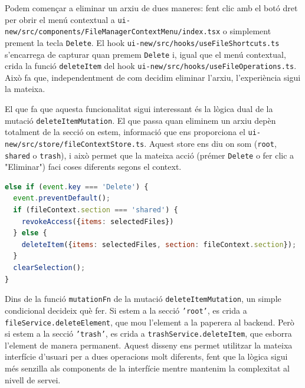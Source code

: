 Podem començar a eliminar un arxiu de dues maneres: fent clic amb el botó dret per obrir el menú contextual a \texttt{ui-new/src/components/FileManagerContextMenu/index.tsx} o simplement prement la tecla \texttt{Delete}. El hook \texttt{ui-new/src/hooks/useFileShortcuts.ts} s'encarrega de capturar quan premem \texttt{Delete} i, igual que el menú contextual, crida la funció \texttt{deleteItem} del hook \texttt{ui-new/src/hooks/useFileOperations.ts}. Això fa que, independentment de com decidim eliminar l'arxiu, l'experiència sigui la mateixa.

El que fa que aquesta funcionalitat sigui interessant és la lògica dual de la mutació \texttt{deleteItemMutation}. El que passa quan eliminem un arxiu depèn totalment de la secció on estem, informació que ens proporciona el \texttt{ui-new/src/store/fileContextStore.ts}. Aquest store ens diu on som (\texttt{root}, \texttt{shared} o \texttt{trash}), i això permet que la mateixa acció (prémer \texttt{Delete} o fer clic a "Eliminar") faci coses diferents segons el context.

\begin{lstlisting}[language=javascript, caption={Gestió de la tecla Delete a `useFileShortcuts.ts`}]
else if (event.key === 'Delete') {
  event.preventDefault();
  if (fileContext.section === 'shared') {
    revokeAccess({items: selectedFiles})
  } else {
    deleteItem({items: selectedFiles, section: fileContext.section});
  }
  clearSelection();
}
\end{lstlisting}

Dins de la funció \texttt{mutationFn} de la mutació \texttt{deleteItemMutation}, un simple condicional decideix què fer. Si estem a la secció \texttt{'root'}, es crida a \texttt{fileService.deleteElement}, que mou l'element a la paperera al backend. Però si estem a la secció \texttt{'trash'}, es crida a \texttt{trashService.deleteItem}, que esborra l'element de manera permanent. Aquest disseny ens permet utilitzar la mateixa interfície d'usuari per a dues operacions molt diferents, fent que la lògica sigui més senzilla als components de la interfície mentre mantenim la complexitat al nivell de servei.

